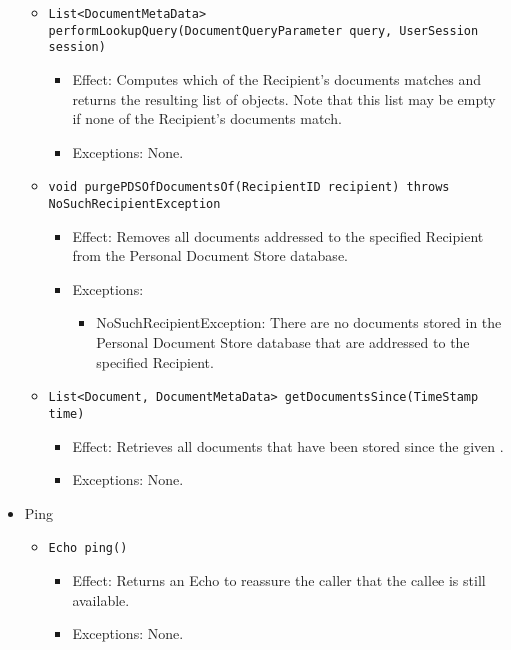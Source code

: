 \begin{itemize}
\begin{itemize}
		\item \texttt{List<DocumentMetaData> performLookupQuery(DocumentQueryParameter query, UserSession session)}
		\begin{itemize}
			\item Effect: Computes which of the Recipient's documents matches  and returns the resulting list of  objects. Note that this list may be empty if none of the Recipient's documents match.
			\item Exceptions: None.
		\end{itemize}

		\item \texttt{void purgePDSOfDocumentsOf(RecipientID recipient) throws NoSuchRecipientException}
		\begin{itemize}
			\item Effect: Removes all documents addressed to the specified Recipient from the Personal Document Store database.
			\item Exceptions:
			\begin{itemize}
				\item NoSuchRecipientException: There are no documents stored in the Personal Document Store database that are addressed to the specified Recipient.
			\end{itemize}
		\end{itemize}

		\item \texttt{List<Document, DocumentMetaData> getDocumentsSince(TimeStamp time)}
		\begin{itemize}
			\item Effect: Retrieves all documents that have been stored since the given .
			\item Exceptions: None.
		\end{itemize}
	\end{itemize}

	\item Ping
	\begin{itemize}
		\item \texttt{Echo ping()}
		\begin{itemize}
			\item Effect: Returns an Echo to reassure the caller that the callee is still available.
			\item Exceptions: None.
		\end{itemize}
	\end{itemize}
\end{itemize}

